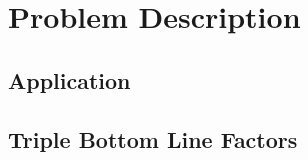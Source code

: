 \documentclass[../mthe-493-project-proposal]{subfiles}
\begin{document}
    \chapter{Problem Description}
    \label{ch:problem-description}
    \blindtext
    
    \section{Application}
    \Blindtext
    
    \section{Triple Bottom Line Factors}
    \blindtext
\end{document}
